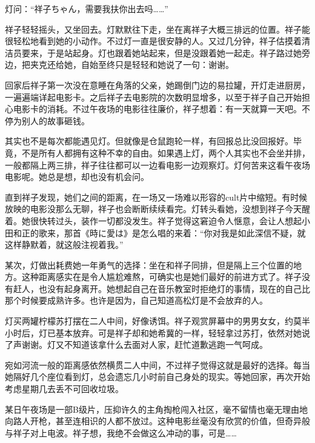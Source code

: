 \documentclass{article}
\begin{document}
灯问：“祥子ちゃん，需要我扶你出去吗……”



祥子轻轻摇头，又坐回去。灯默默往下走，坐在离祥子大概三排远的位置。祥子能很轻松地看到她的小动作。不过灯一直是很安静的人。又过几分钟，祥子估摸着清洁员要来，于是站起身。灯也跟着她站起来，但是没跟着她一起走。祥子路过她旁边，把夹克还给她，自始至终只是轻轻和她说了一句：谢谢。



回家后祥子第一次没在意睡在角落的父亲，她踢倒门边的易拉罐，开灯走进厨房，一遍遍端详起电影卡。之后祥子去电影院的次数明显增多，以至于祥子自己开始担心电影卡的消耗。不过午夜场的电影往往廉价，祥子想着：有一天就算一天吧。不停为别人的故事砸钱。



其实也不是每次都能遇见灯。但就像是仓鼠跑轮一样，有回报总比没回报好。毕竟，不是所有人都拥有这种不幸的自由。如果遇上灯，两个人其实也不会坐并排，一般都隔上两三排，祥子往往都可以一边看电影一边观察灯。灯何苦来这看午夜场电影呢。她总是想，却也没有机会问。



直到祥子发现，她们之间的距离，在一场又一场难以形容的cult片中缩短。有时候放映的电影没那么无聊，祥子也会断断续续看完。灯转头看她，没想到祥子今天醒着。她很快转过头，装作一切都没发生。祥子觉得这窘迫令人惬意，会让人想起小田和正的歌来，那首《時に愛は》是怎么唱的来着：“你对我是如此深信不疑，就这样静默着，就这般注视着我。”



某次，灯做出耗费她一年勇气的选择：坐在和祥子同排，但是隔上三个位置的地方。这种距离感实在是令人尴尬难熬，可确实也是她们最好的前进方式了。祥子没有赶人，也没有起身离开。她想起自己在音乐教室时拒绝灯的事情，现在的自己比那个时候要成熟许多。也许是因为，自己知道高松灯是不会放弃的人。



灯买两罐柠檬苏打摆在二人中间，好像诱饵。祥子观赏屏幕中的男男女女，约莫半小时后，灯已基本放弃。可是祥子却和她希冀的一样，轻轻拿过苏打，依然对她说了声谢谢。灯又不知道该拿什么去面对人家，赶忙道歉逃跑一气呵成。



宛如河流一般的距离感依然横贯二人中间，不过祥子觉得这就是最好的选择。每当她隔好几个座位看到灯，总会遗忘几小时前自己身处的现实。等她回家，再次开始考虑星期几去丢不可回收垃圾。



某日午夜场是一部B级片，压抑许久的主角掏枪闯入社区，毫不留情也毫无理由地向路人开枪，甚至连相识的人都不放过。这种电影丝毫没有欣赏的价值，但奇异般与祥子对上电波。祥子想，我绝不会做这么冲动的事，可是……
\end{document}
